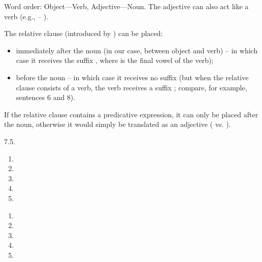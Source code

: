 \begin{refsection}
\begin{discussion}

 Word order: Object---Verb, Adjective---Noun. The adjective can also act like a verb (e.g.,  -- ).

 The relative clause (introduced by ) can be placed:
\begin{itemize}

    \item immediately after the noun (in our case, between object and verb) – in which case it receives the suffix , where  is the final vowel of the verb);
    \item before the noun – in which case it receives no suffix (but when the relative clause consists of a verb, the verb receives a suffix ; compare, for example, sentences 6 and 8).
\end{itemize}

 If the relative clause contains a predicative expression, it can only be placed after the noun, otherwise it would simply be translated as an adjective ( vs. ).

 \end{discussion}



\begin{practiceproblemsolution}{7.5. \langnameMundari}

\begin{solutions}[label=Solution 7.5\alph*]
    \item
        \begin{enumerate}[start = 11]
            \item {}
            \item {}
            \item {}
            \item {}
            \item {}
        \end{enumerate}
    \item
        \begin{enumerate}[start = 16]
            \item {}
            \item {}
            \item {}
            \item {}
            \item {}
        \end{enumerate}
\end{solutions}


\end{practiceproblemsolution}
\end{refsection}
